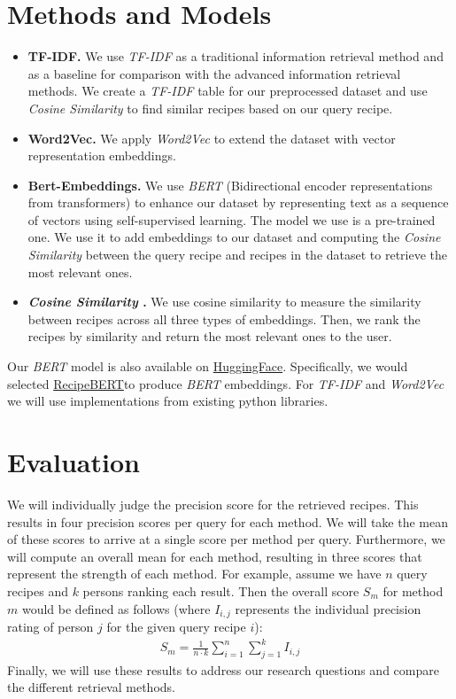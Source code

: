 \documentclass{article}
\newcommand{\wordtovec}{\textit{Word2Vec} }
\newcommand{\bert}{\textit{BERT} }
\newcommand{\tfidf}{\textit{TF-IDF} }
\newcommand{\cossim}{\textit{Cosine Similarity} }
\newcommand{\huggingface}{\href{https://huggingface.co/datasets/} {HuggingFace}}
\newcommand{\bertmodel}{\href{https://huggingface.co/alexdseo/RecipeBERT}{RecipeBERT}}
\begin{document}
\section{Methods and Models}
\begin{itemize}
    \item \textbf{TF-IDF.} 
    We use \tfidf as a traditional information retrieval method and as a baseline for comparison with the advanced information retrieval methods. 
    We create a \tfidf table for our preprocessed dataset and use \cossim to find similar recipes based on our query recipe. 
    \item \textbf{Word2Vec.} 
    We apply \wordtovec to extend the dataset with vector representation embeddings. 
    \item \textbf{Bert-Embeddings.} 
    We use \bert (Bidirectional encoder representations from transformers) to enhance our dataset by representing text as a sequence of vectors using self-supervised learning.
    The model we use is a pre-trained one. 
    We use it to add embeddings to our dataset and computing the \cossim between the query recipe and recipes in the dataset to retrieve the most relevant ones.
    \item \textbf{\cossim.} 
    We use cosine similarity to measure the similarity between recipes across all three types of embeddings. 
    Then, we rank the recipes by similarity and return the most relevant ones to the user.
\end{itemize} 

Our \bert model is also available on \huggingface.
Specifically, we would selected \bertmodel to produce \bert embeddings.
For \tfidf and \wordtovec we will use implementations from existing python libraries.


\section{Evaluation}
We will individually judge the precision score for the retrieved recipes.
This results in four precision scores per query for each method.
We will take the mean of these scores to arrive at a single score per method per query. 
Furthermore, we will compute an overall mean for each method, resulting in three scores that represent the strength of each method. 
For example, assume we have $n$ query recipes and $k$ persons ranking each result.
Then the overall score $S_m$ for method $m$ would be defined as follows (where $I_{i,j}$ represents the individual precision rating of person $j$ for the given query recipe $i$):
\begin{align*}
    S_m = \frac{1}{n \cdot k} \sum_{i=1}^n \sum_{j=1}^k I_{i, j}
\end{align*}
Finally, we will use these results to address our research questions and compare the different retrieval methods.
\end{document}
